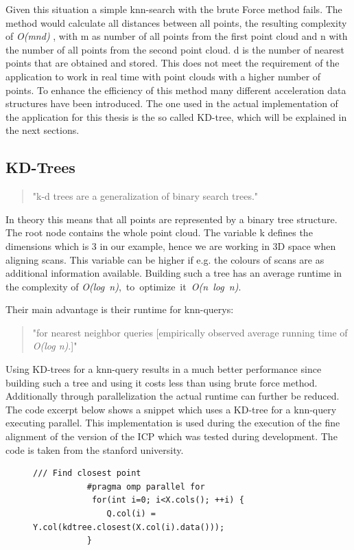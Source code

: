 \documentclass[hyperref,english,bachelorofscience,bibnum,twoside]{cgvpub}
\begin{document}
Given this situation a simple knn-search with the brute Force method fails. The method would calculate all distances between all points, the resulting complexity of  \textit{O(mnd)} \cite{Garcia2008}, with m as number of all points from the first point cloud and n with the number of all points from the second point cloud. d is the number of nearest points that are obtained and stored. This does not meet the requirement of the application to work in real time with point clouds with a higher number of points.
To enhance the efficiency of this method many different acceleration data structures have been introduced. The one used in the actual implementation of the application for this thesis is the so called KD-tree, which will be explained in the next sections.

\subsection{KD-Trees}

\begin{quote}
"k-d trees are a generalization of binary search trees."\cite{Nuchter2007}
\end{quote}
In theory this means that all points are represented by a binary tree structure. The root node contains the whole point cloud. The variable k defines the dimensions which is 3 in our example, hence we are working in 3D space when aligning scans. This variable can be higher if e.g. the colours of scans are as additional information available.
Building such a tree has an average runtime in the complexity of \mbox{\textit{O(log n)}, to optimize it \textit{O(n log n)}\cite{bentley1975}}.

Their main advantage is their runtime for knn-querys: 
\begin{quote}
"for nearest neighbor queries [empirically observed average running time of \textit{O(log n)}.]" \cite{bentley1975}
\end{quote}
Using KD-trees for a knn-query results in a much better performance since building such a tree and using it costs less than using brute force method. Additionally through parallelization the actual runtime can further be reduced. The code excerpt below shows a snippet which uses a KD-tree for a knn-query executing parallel. This implementation is used during the execution of the fine alignment of the version of the ICP which was tested during development. The code is taken from the stanford university.

\begin{figure}[htbp]
\begin{lstlisting}[frame=trbl]
           /// Find closest point
           #pragma omp parallel for
            for(int i=0; i<X.cols(); ++i) {
               Q.col(i) = Y.col(kdtree.closest(X.col(i).data()));
           }
\end{lstlisting}
\end{figure}
\end{document}
